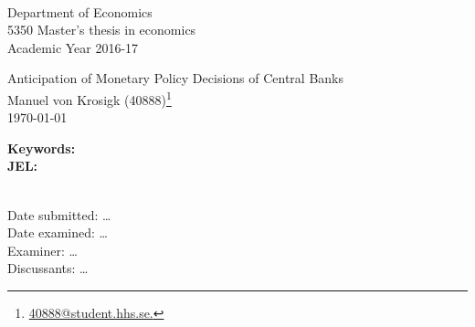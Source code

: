 
	\\
	Department of Economics\\
	5350 Master’s thesis in economics\\
	Academic Year 2016-17\\

	\vspace{1cm}	
	\begin{centering}
		\Large{Anticipation of Monetary Policy Decisions of Central Banks}\\
		\vspace{.5cm}	
		\large{Manuel von Krosigk (40888)}\footnote{\href{mailto:40888@student.hhs.se}{40888@student.hhs.se.}}\\
		\vspace{.5cm}	
		\large{\today}\\
	\end{centering}	
	\begin{abstract}
		\dots
	\end{abstract}
	\textbf{Keywords:}
	\\\textbf{JEL:}
	
	\vfill
	\\Date submitted: \dots
	\\Date examined: \dots
	\\Examiner: \dots
	\\Discussants: \dots